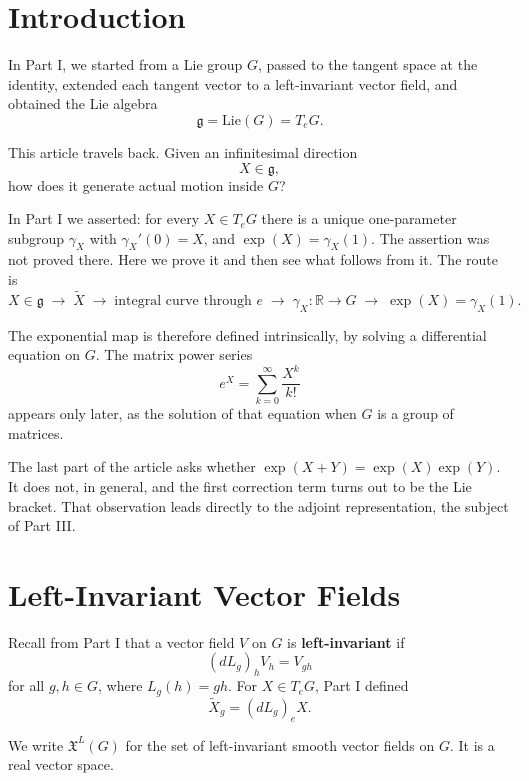 \documentclass[11pt]{article}
\begin{document}
\maketitle

\section*{Introduction}

In Part I, we started from a Lie group $G$, passed to the tangent space at the identity, extended each tangent vector to a left-invariant vector field, and obtained the Lie algebra
\[
\mathfrak{g} = \mathrm{Lie}(G) = T_eG.
\]

This article travels back. Given an infinitesimal direction
\[
X \in \mathfrak{g},
\]
how does it generate actual motion inside $G$?

In Part I we asserted: for every $X \in T_eG$ there is a unique one-parameter subgroup $\gamma_X$ with $\gamma_X'(0) = X$, and $\exp(X) = \gamma_X(1)$. The assertion was not proved there. Here we prove it and then see what follows from it. The route is
\[
X \in \mathfrak{g}
\;\longrightarrow\;
\widetilde{X}
\;\longrightarrow\;
\text{integral curve through } e
\;\longrightarrow\;
\gamma_X : \mathbb{R} \to G
\;\longrightarrow\;
\exp(X) = \gamma_X(1).
\]

The exponential map is therefore defined intrinsically, by solving a differential equation on $G$. The matrix power series
\[
e^X = \sum_{k=0}^{\infty} \frac{X^k}{k!}
\]
appears only later, as the solution of that equation when $G$ is a group of matrices.

The last part of the article asks whether $\exp(X + Y) = \exp(X)\exp(Y)$. It does not, in general, and the first correction term turns out to be the Lie bracket. That observation leads directly to the adjoint representation, the subject of Part III.

\section{Left-Invariant Vector Fields}

Recall from Part I that a vector field $V$ on $G$ is \textbf{left-invariant} if
\[
(dL_g)_h V_h = V_{gh}
\]
for all $g, h \in G$, where $L_g(h) = gh$. For $X \in T_eG$, Part I defined
\[
\widetilde{X}_g = (dL_g)_e X.
\]

We write $\mathfrak{X}^L(G)$ for the set of left-invariant smooth vector fields on $G$. It is a real vector space.
\end{document}
